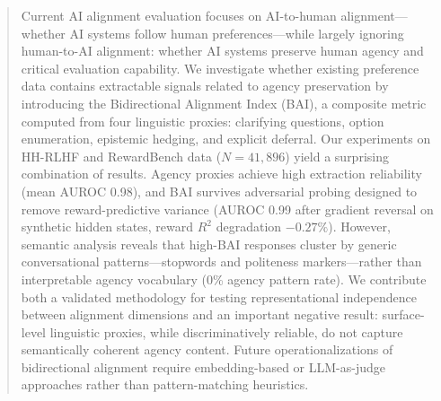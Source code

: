 \begin{abstract}
Current AI alignment evaluation focuses on AI-to-human alignment---whether AI systems follow human preferences---while largely ignoring human-to-AI alignment: whether AI systems preserve human agency and critical evaluation capability. We investigate whether existing preference data contains extractable signals related to agency preservation by introducing the Bidirectional Alignment Index (BAI), a composite metric computed from four linguistic proxies: clarifying questions, option enumeration, epistemic hedging, and explicit deferral. Our experiments on HH-RLHF and RewardBench data ($N=41,896$) yield a surprising combination of results. Agency proxies achieve high extraction reliability (mean AUROC 0.98), and BAI survives adversarial probing designed to remove reward-predictive variance (AUROC 0.99 after gradient reversal on synthetic hidden states, reward $R^2$ degradation $-0.27\%$). However, semantic analysis reveals that high-BAI responses cluster by generic conversational patterns---stopwords and politeness markers---rather than interpretable agency vocabulary (0\% agency pattern rate). We contribute both a validated methodology for testing representational independence between alignment dimensions and an important negative result: surface-level linguistic proxies, while discriminatively reliable, do not capture semantically coherent agency content. Future operationalizations of bidirectional alignment require embedding-based or LLM-as-judge approaches rather than pattern-matching heuristics.
\end{abstract}

